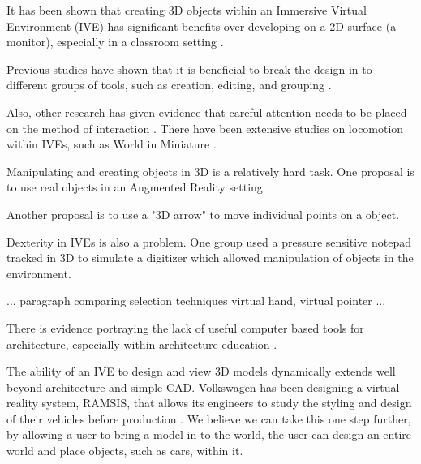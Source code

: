 It has been shown that creating 3D objects within an Immersive Virtual Environment (IVE) has significant benefits over developing on a 2D surface (a monitor)\cite{Kaufmann:Usability}, especially in a classroom setting \cite{Kaufmann:LearningGeometry}.

Previous studies have shown that it is beneficial to break the design in to different groups of tools, such as creation, editing, and grouping
\cite{Butterworth:1992:3DM}.

Also, other research has given evidence that careful attention needs to be placed on the method of interaction \cite{Bowman98interactiontechniques}.
There have been extensive studies on locomotion within IVEs, such as World in Miniature \cite{Pausch:WorldInMiniature}.

Manipulating and creating objects in 3D is a relatively hard task\cite{Mine:MovingObjects}.
One proposal is to use real objects in an Augmented Reality setting
\cite{Jota:2011:CVM:1979742.1979915}.

Another proposal is to use a "3D arrow" to move individual points on a object\cite{5759472}.

Dexterity in IVEs is also a problem.
One group used a pressure sensitive notepad tracked in 3D to simulate a digitizer which allowed manipulation of
objects in the environment\cite{658467}.

... paragraph comparing selection techniques  virtual hand, virtual pointer \cite{5307641}...

There is evidence portraying the lack of useful computer based tools for architecture, especially within architecture education \cite{Dobson:Architecture}.

The ability of an IVE to design and view 3D models dynamically extends well beyond architecture and simple CAD.
Volkswagen has been designing a virtual reality system, RAMSIS, that allows its engineers to study the styling and design of their vehicles before production \cite{Purschke:Cars}.
We believe we can take this one step further, by allowing a user to bring a model in to the world, the user can design an entire world and place objects, such as cars, within it.

